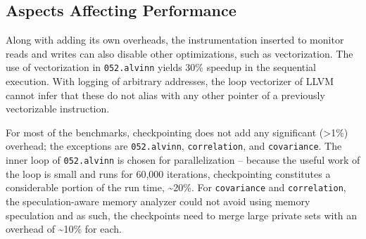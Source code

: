 


\subsection{Aspects Affecting Performance}


Along with adding its own overheads, the instrumentation inserted to monitor
reads and writes can also disable other optimizations, such as
vectorization. The use of vectorization in \texttt{052.alvinn} yields 30\%
speedup in the sequential execution. With logging of arbitrary addresses, the loop
vectorizer of LLVM cannot infer that these do not alias with any other
pointer of a previously vectorizable instruction.

For most of the benchmarks, checkpointing does not add any
significant (>1\%) overhead; the exceptions are
\texttt{052.alvinn}, \texttt{correlation}, and \texttt{covariance}.
The inner loop of \texttt{052.alvinn} is chosen for parallelization --
because the useful work of the loop is small and runs for 60,000
iterations, checkpointing constitutes a considerable portion of the run
time, \textasciitilde20\%. For \texttt{covariance} and \texttt{correlation},
the speculation-aware memory analyzer could not avoid using memory
speculation and as such, the checkpoints need to merge large private sets
with an overhead of \textasciitilde10\% for each.

